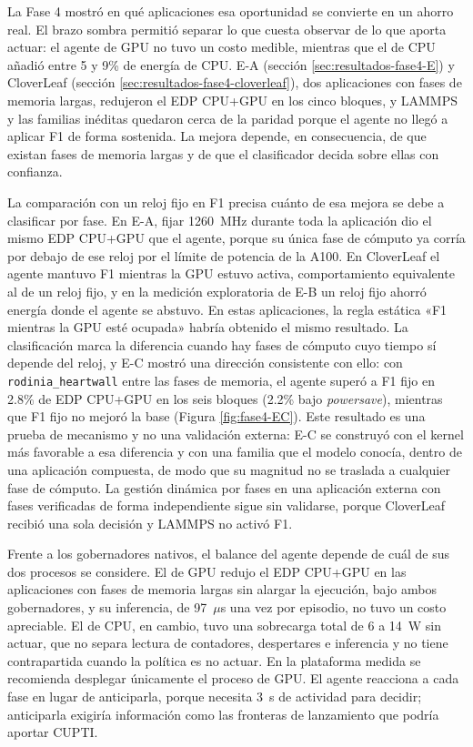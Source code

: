 La Fase 4 mostró en qué aplicaciones esa oportunidad se convierte en un ahorro real. El brazo sombra permitió separar lo que cuesta observar de lo que aporta actuar: el agente de GPU no tuvo un costo medible, mientras que el de CPU añadió entre 5 y 9\% de energía de CPU. E-A (sección \ref{sec:resultados-fase4-E}) y CloverLeaf (sección \ref{sec:resultados-fase4-cloverleaf}), dos aplicaciones con fases de memoria largas, redujeron el EDP CPU+GPU en los cinco bloques, y LAMMPS y las familias inéditas quedaron cerca de la paridad porque el agente no llegó a aplicar F1 de forma sostenida. La mejora depende, en consecuencia, de que existan fases de memoria largas y de que el clasificador decida sobre ellas con confianza.

La comparación con un reloj fijo en F1 precisa cuánto de esa mejora se debe a clasificar por fase. En E-A, fijar 1260~MHz durante toda la aplicación dio el mismo EDP CPU+GPU que el agente, porque su única fase de cómputo ya corría por debajo de ese reloj por el límite de potencia de la A100. En CloverLeaf el agente mantuvo F1 mientras la GPU estuvo activa, comportamiento equivalente al de un reloj fijo, y en la medición exploratoria de E-B un reloj fijo ahorró energía donde el agente se abstuvo. En estas aplicaciones, la regla estática «F1 mientras la GPU esté ocupada» habría obtenido el mismo resultado. La clasificación marca la diferencia cuando hay fases de cómputo cuyo tiempo sí depende del reloj, y E-C mostró una dirección consistente con ello: con \texttt{rodinia\_heartwall} entre las fases de memoria, el agente superó a F1 fijo en 2.8\% de EDP CPU+GPU en los seis bloques (2.2\% bajo \textit{powersave}), mientras que F1 fijo no mejoró la base (Figura \ref{fig:fase4-EC}). Este resultado es una prueba de mecanismo y no una validación externa: E-C se construyó con el kernel más favorable a esa diferencia y con una familia que el modelo conocía, dentro de una aplicación compuesta, de modo que su magnitud no se traslada a cualquier fase de cómputo. La gestión dinámica por fases en una aplicación externa con fases verificadas de forma independiente sigue sin validarse, porque CloverLeaf recibió una sola decisión y LAMMPS no activó F1.

Frente a los gobernadores nativos, el balance del agente depende de cuál de sus dos procesos se considere. El de GPU redujo el EDP CPU+GPU en las aplicaciones con fases de memoria largas sin alargar la ejecución, bajo ambos gobernadores, y su inferencia, de 97~$\mu$s una vez por episodio, no tuvo un costo apreciable. El de CPU, en cambio, tuvo una sobrecarga total de 6 a 14~W sin actuar, que no separa lectura de contadores, despertares e inferencia y no tiene contrapartida cuando la política es no actuar. En la plataforma medida se recomienda desplegar únicamente el proceso de GPU. El agente reacciona a cada fase en lugar de anticiparla, porque necesita 3~s de actividad para decidir; anticiparla exigiría información como las fronteras de lanzamiento que podría aportar CUPTI.

